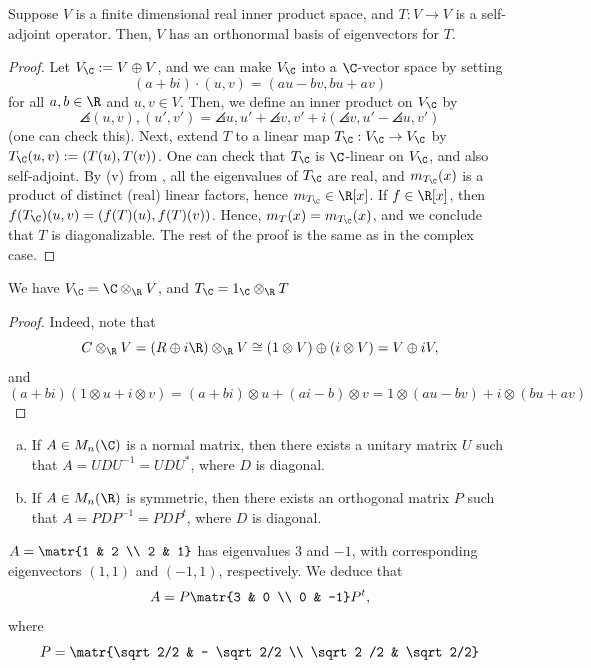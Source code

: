 \begin{thm}
    Suppose $V$ is a finite dimensional real inner product space, and $T:V \to V$ is a self-adjoint operator. Then, $V$ has an orthonormal basis of eigenvectors for $T$.
\end{thm}

\begin{proof}
    Let $V_\C := V \oplus V$, and we can make $V_\C$ into a $\C$-vector space by setting
    $$(a+bi)\cdot (u,v)=(au-bv,bu+av)$$
    for all $a,b \in \R$ and $u,v \in V$. Then, we define an inner product on $V_\C$ by
    $$\angles{(u,v),(u',v')}=\angles{u,u'}+\angles{v,v'}+i(\angles{v,u'}-\angles{u,v'})$$
    (one can check this). Next, extend $T$ to a linear map $T_\C :V_\C \to V_\C$ by $T_\C (u,v) := (T(u),T(v))$. One can check that $T_\C$ is $\C$-linear on $V_\C$, and also self-adjoint. By (v) from , all the eigenvalues of $T_\C$ are real, and $m_{T_\C}(x)$ is a product of distinct (real) linear factors, hence $m_{T_\C} \in \R[x]$. If $f \in \R[x]$, then $f(T_\C)(u,v)=(f(T)(u),f(T)(v))$. Hence, $m_T(x) = m_{T_\C}(x)$, and we conclude that $T$ is diagonalizable. The rest of the proof is the same as in the complex case.
\end{proof}

\begin{rmk}
    We have $V_\C = \C \otimes _\R V$, and $T_\C = 1_\C \otimes _\R T$
\end{rmk}
\begin{proof}
    Indeed, note that
    $$C \otimes _{\R}V = (R \oplus i\R)\otimes_\R V \cong (1 \otimes V)\oplus (i \otimes V) = V \oplus iV,$$
    and
    $$(a+bi)(1 \otimes u + i \otimes v) = (a+bi) \otimes u + (ai-b)\otimes v = 1 \otimes (au-bv)+i\otimes (bu+av)$$
\end{proof}

\begin{thm}
    \begin{enumerate}[(a)]
        \item If $A \in M_n(\C)$ is a normal matrix, then there exists a unitary matrix $U$ such that $A=UDU^{-1}=UDU^*$, where $D$ is diagonal.
        \item If $A \in M_n(\R)$ is symmetric, then there exists an orthogonal matrix $P$ such that $A=PDP^{-1}=PDP^t$, where $D$ is diagonal.
    \end{enumerate}
\end{thm}

\begin{ex}
    $A=\matr{1 & 2  \\ 2 & 1}$ has eigenvalues $3$ and $-1$, with corresponding eigenvectors $(1,1)$ and $(-1,1)$, respectively. We deduce that
    $$A = P\matr{3 & 0 \\ 0 & -1}P^t,$$
    where
    $$P = \matr{\sqrt 2/2 & - \sqrt 2/2 \\ \sqrt 2 /2 & \sqrt 2/2}$$
\end{ex}

